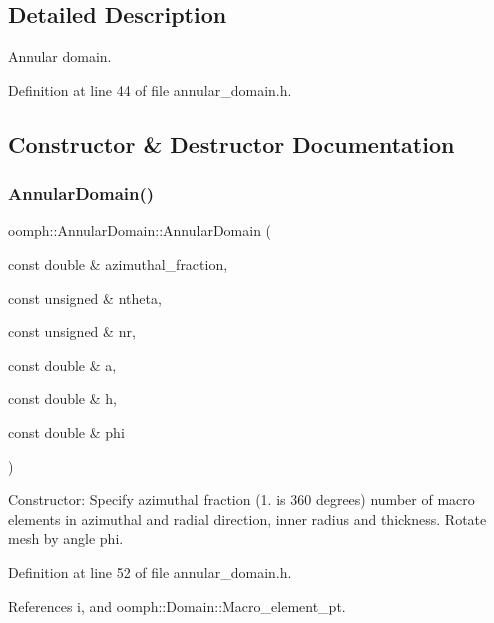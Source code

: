 \subsection{Detailed Description}
Annular domain. 

Definition at line 44 of file annular\+\_\+domain.\+h.



\subsection{Constructor \& Destructor Documentation}
\mbox{\label{classoomph_1_1AnnularDomain_aa0b4ad9d8e63de8aa0dc2d462a016143}} 
\subsubsection{\texorpdfstring{Annular\+Domain()}{AnnularDomain()}\hspace{0.1cm}{\footnotesize\ttfamily [1/2]}}
{\footnotesize\ttfamily oomph\+::\+Annular\+Domain\+::\+Annular\+Domain (\begin{DoxyParamCaption}\item[{const double \&}]{azimuthal\+\_\+fraction,  }\item[{const unsigned \&}]{ntheta,  }\item[{const unsigned \&}]{nr,  }\item[{const double \&}]{a,  }\item[{const double \&}]{h,  }\item[{const double \&}]{phi }\end{DoxyParamCaption})\hspace{0.3cm}{\ttfamily [inline]}}



Constructor\+: Specify azimuthal fraction (1. is 360 degrees) number of macro elements in azimuthal and radial direction, inner radius and thickness. Rotate mesh by angle phi. 



Definition at line 52 of file annular\+\_\+domain.\+h.



References i, and oomph\+::\+Domain\+::\+Macro\+\_\+element\+\_\+pt.

\mbox{\label{classoomph_1_1AnnularDomain_ad081791409dc419594d0a64e1c17fb09}} 
